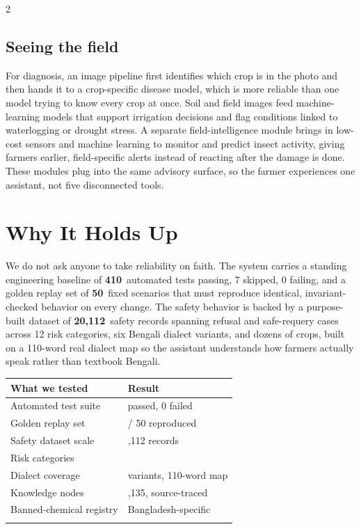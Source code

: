 \documentclass[11pt]{article}
\newcommand{\stat}[2]{{\color{brandgreen}\textbf{#1}}\ #2}
\begin{document}
\begin{multicols}{2}
\subsection{Seeing the field}

For diagnosis, an image pipeline first identifies which crop is in the photo and then hands it to a crop-specific disease model, which is more reliable than one model trying to know every crop at once. Soil and field images feed machine-learning models that support irrigation decisions and flag conditions linked to waterlogging or drought stress. A separate field-intelligence module brings in low-cost sensors and machine learning to monitor and predict insect activity, giving farmers earlier, field-specific alerts instead of reacting after the damage is done. These modules plug into the same advisory surface, so the farmer experiences one assistant, not five disconnected tools.

\section{Why It Holds Up}

We do not ask anyone to take reliability on faith. The system carries a standing engineering baseline of \stat{410}{automated tests passing, 7 skipped, 0 failing}, and a golden replay set of \stat{50}{fixed scenarios} that must reproduce identical, invariant-checked behavior on every change. The safety behavior is backed by a purpose-built dataset of \stat{20{,}112}{safety records} spanning refusal and safe-requery cases across 12 risk categories, six Bengali dialect variants, and dozens of crops, built on a 110-word real dialect map so the assistant understands how farmers actually speak rather than textbook Bengali.

\begin{center}
\begin{tabular}{@{}>{\raggedright\arraybackslash}p{3.3cm} >{\raggedright\arraybackslash}p{4.0cm}@{}}
\arrayrulecolor{brandgreen}\toprule
\textbf{What we tested} & \textbf{Result} \\
\midrule
Automated test suite & 410 passed, 0 failed \\
Golden replay set & 50 / 50 reproduced \\
Safety dataset scale & 20,112 records \\
Risk categories & 12 \\
Dialect coverage & 6 variants, 110-word map \\
Knowledge nodes & 2,135, source-traced \\
Banned-chemical registry & Bangladesh-specific \\
\arrayrulecolor{brandgreen}\bottomrule
\end{tabular}
\end{center}


\end{multicols}
\end{document}
